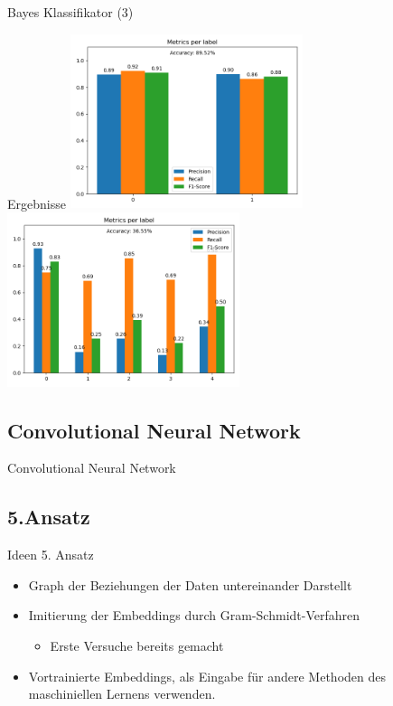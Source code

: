 \documentclass[aspectratio=169]{beamer} %
\begin{document}
\begin{frame}{Bayes Klassifikator (3)}
    \begin{block}{Ergebnisse}
        \includegraphics[width=6.8cm]{figures/evaluation_nbb.png} \includegraphics[width=6.8cm]{figures/evaluation_nbm.png}
    \end{block}
\end{frame}

\subsection{Convolutional Neural Network}

\begin{frame}{Convolutional Neural Network}

\end{frame}

\subsection{5.Ansatz}
\begin{frame}
    \begin{block}{Ideen 5. Ansatz}
        \begin{itemize}
            \item Graph der Beziehungen der Daten untereinander Darstellt
            \item Imitierung der Embeddings durch Gram-Schmidt-Verfahren
                  \begin{itemize}
                      \item Erste Versuche bereits gemacht
                  \end{itemize}
            \item Vortrainierte Embeddings, als Eingabe f\"ur andere Methoden des maschiniellen Lernens verwenden.
        \end{itemize}
    \end{block}
\end{frame}
\end{document}
